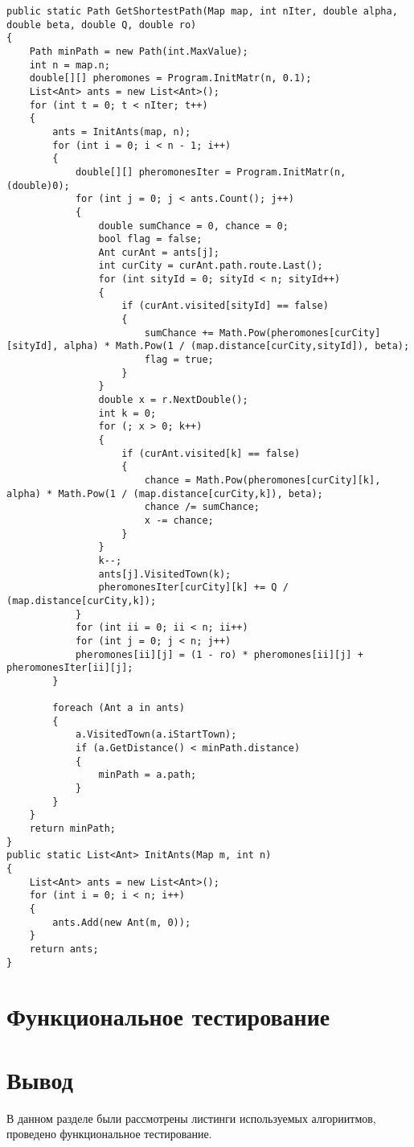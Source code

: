 \begin{center}
\begin{lstlisting}[label=l2, caption={Реализация муравьиного алгоритма}]
     public static Path GetShortestPath(Map map, int nIter, double alpha, double beta, double Q, double ro)
{
	Path minPath = new Path(int.MaxValue);
	int n = map.n;
	double[][] pheromones = Program.InitMatr(n, 0.1);
	List<Ant> ants = new List<Ant>();
	for (int t = 0; t < nIter; t++)
	{
		ants = InitAnts(map, n);
		for (int i = 0; i < n - 1; i++)
		{
			double[][] pheromonesIter = Program.InitMatr(n, (double)0); 
			for (int j = 0; j < ants.Count(); j++) 
			{
				double sumChance = 0, chance = 0;
				bool flag = false;
				Ant curAnt = ants[j];
				int curCity = curAnt.path.route.Last();
				for (int sityId = 0; sityId < n; sityId++) 
				{
					if (curAnt.visited[sityId] == false)
					{
						sumChance += Math.Pow(pheromones[curCity][sityId], alpha) * Math.Pow(1 / (map.distance[curCity,sityId]), beta); 
						flag = true;
					}
				}
				double x = r.NextDouble();
				int k = 0;
				for (; x > 0; k++)
				{
					if (curAnt.visited[k] == false)
					{
						chance = Math.Pow(pheromones[curCity][k], alpha) * Math.Pow(1 / (map.distance[curCity,k]), beta);
						chance /= sumChance;
						x -= chance;
					}
				}
				k--;
				ants[j].VisitedTown(k);
				pheromonesIter[curCity][k] += Q / (map.distance[curCity,k]);
			}
			for (int ii = 0; ii < n; ii++)
			for (int j = 0; j < n; j++)
			pheromones[ii][j] = (1 - ro) * pheromones[ii][j] + pheromonesIter[ii][j];
		}
		
		foreach (Ant a in ants)
		{
			a.VisitedTown(a.iStartTown);
			if (a.GetDistance() < minPath.distance)
			{
				minPath = a.path;
			}
		}                
	}
	return minPath;
}
public static List<Ant> InitAnts(Map m, int n)
{
	List<Ant> ants = new List<Ant>();
	for (int i = 0; i < n; i++)
	{
		ants.Add(new Ant(m, 0));
	}
	return ants;
}
\end{lstlisting}
\end{center}


\newpage
\section{Функциональное тестирование}


\section*{\hsp Вывод}
В данном разделе были рассмотрены листинги используемых алгориитмов, проведено функциональное тестирование.
